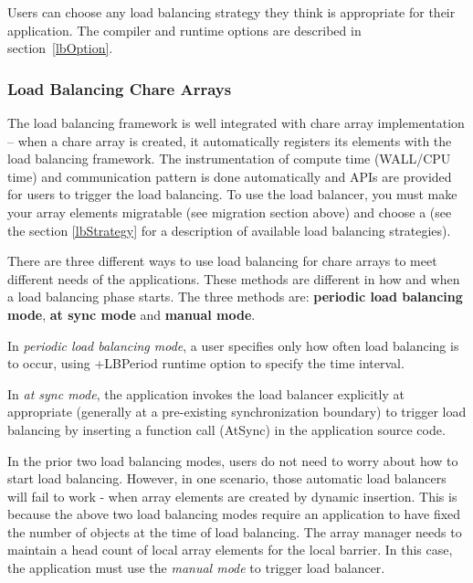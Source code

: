 Users can choose any load balancing strategy they think is appropriate for their
application. The compiler and runtime options are described in
section~\ref{lbOption}.


\subsubsection{Load Balancing Chare Arrays}
\label{lbarray}

The load balancing framework is well integrated with chare array implementation
-- when a chare array is created, it automatically registers its elements with
the load balancing framework. The instrumentation of compute time (WALL/CPU
time) and communication pattern is done automatically and APIs are provided
for users to trigger the load balancing.  To use the load balancer, you must
make your array elements migratable (see migration section above) and choose a
 (see the section \ref{lbStrategy} for a
description of available load balancing strategies).

There are three different ways to use load balancing for chare arrays to meet
different needs of the applications. These methods are different in how and
when a load balancing phase starts. The three methods are: {\bf periodic load
balancing mode}, {\bf at sync mode} and {\bf manual mode}.

In {\em periodic load balancing mode}, a user specifies only how often
load balancing is to occur, using +LBPeriod runtime option to specify
the time interval.

In {\em at sync mode}, the application invokes the load balancer
explicitly at appropriate (generally at a pre-existing synchronization
boundary) to trigger load balancing by inserting a function call
(AtSync) in the application source code.

In the prior two load balancing modes, users do not need to worry
about how to start load balancing.  However, in one scenario, those
automatic load balancers will fail to work - when array elements are
created by dynamic insertion.  This is because the above two load
balancing modes require an application to have fixed the number of
objects at the time of load balancing.  The array manager needs to
maintain a head count of local array elements for the local barrier.
In this case, the application must use the {\em manual mode} to
trigger load balancer.

